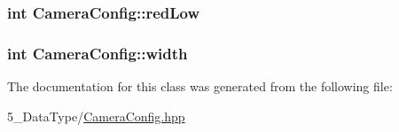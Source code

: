 \subsubsection[{\texorpdfstring{red\+Low}{redLow}}]{\setlength{\rightskip}{0pt plus 5cm}int Camera\+Config\+::red\+Low}\hypertarget{class_camera_config_af17574ff4f72c58e893b999969be99a5}{}\label{class_camera_config_af17574ff4f72c58e893b999969be99a5}
\subsubsection[{\texorpdfstring{width}{width}}]{\setlength{\rightskip}{0pt plus 5cm}int Camera\+Config\+::width}\hypertarget{class_camera_config_a96696c7f5168a06e31f46bef172d60d1}{}\label{class_camera_config_a96696c7f5168a06e31f46bef172d60d1}


The documentation for this class was generated from the following file\+:\begin{DoxyCompactItemize}
\item 
5\+\_\+\+Data\+Type/\hyperlink{_camera_config_8hpp}{Camera\+Config.\+hpp}\end{DoxyCompactItemize}

